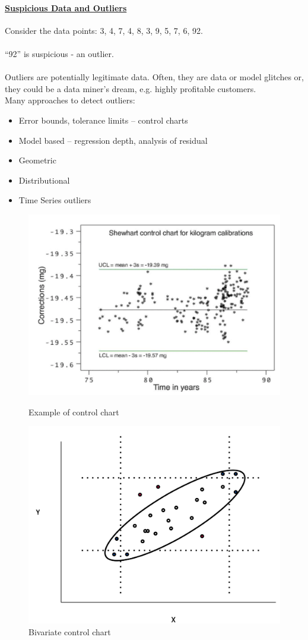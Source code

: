 \documentclass[10pt,a4paper]{article}
\newcommand{\nline}{\\~\\}
\begin{document}
\paragraph{\uline{Suspicious Data and Outliers}}
Consider the data points: 3, 4, 7, 4, 8, 3, 9, 5, 7, 6, 92. \nline
“92” is suspicious - an outlier. \nline 
Outliers are potentially legitimate data. Often, they are data or model glitches or, they could be a data miner’s dream, e.g. highly profitable customers. \\
Many approaches to detect outliers:
\begin{itemize}
	\item Error bounds, tolerance limits – control charts
	\item Model based – regression depth, analysis of residual
	\item Geometric
	\item Distributional
	\item Time Series outliers
\end{itemize}
\begin{figure}[h!]
\begin{minipage}{.5\textwidth}
  \centering
  \includegraphics[width=.9\linewidth]{images/control-charts}
  \caption{Example of control chart}
\end{minipage}%
\begin{minipage}{.5\textwidth}
  \centering
  \includegraphics[width=.9\linewidth]{images/bivariate-charts}
    \caption{Bivariate control chart}
\end{minipage}
\end{figure}
\pagebreak
\end{document}
